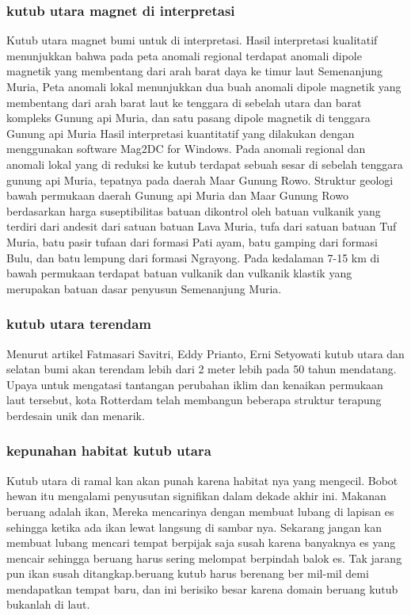 \subsubsection{kutub utara magnet di interpretasi}
		Kutub utara magnet bumi untuk di interpretasi. Hasil interpretasi kualitatif menunjukkan bahwa pada peta anomali regional terdapat anomali dipole 
	magnetik yang membentang dari arah barat daya ke timur laut Semenanjung Muria, Peta anomali lokal menunjukkan dua buah anomali dipole magnetik yang 
	membentang dari arah barat laut ke tenggara di sebelah utara dan barat kompleks Gunung api Muria, dan satu pasang dipole magnetik di tenggara Gunung api
	Muria Hasil interpretasi kuantitatif yang dilakukan dengan menggunakan software Mag2DC for Windows. Pada anomali regional dan anomali lokal yang di reduksi
	ke kutub terdapat sebuah sesar di sebelah tenggara gunung api Muria, tepatnya pada daerah Maar Gunung Rowo. Struktur geologi bawah permukaan daerah 
	Gunung api Muria dan Maar Gunung Rowo berdasarkan harga suseptibilitas batuan dikontrol oleh batuan vulkanik yang terdiri dari andesit dari 
	satuan batuan Lava Muria, tufa dari satuan batuan Tuf Muria, batu pasir tufaan dari formasi Pati ayam, batu gamping dari formasi Bulu, dan 
	batu lempung dari formasi Ngrayong. Pada kedalaman 7-15 km di bawah permukaan terdapat batuan vulkanik dan vulkanik klastik yang merupakan 
	batuan dasar penyusun Semenanjung Muria.
	
\subsubsection {kutub utara terendam}

		Menurut artikel Fatmasari Savitri, Eddy Prianto, Erni Setyowati kutub utara dan selatan bumi akan terendam lebih dari 2 meter lebih pada 50 
	tahun mendatang. Upaya untuk mengatasi tantangan perubahan iklim dan kenaikan permukaan laut tersebut, kota Rotterdam telah membangun beberapa 
	struktur terapung berdesain unik dan menarik. 

\subsubsection {kepunahan habitat kutub utara}
		Kutub utara di ramal kan akan punah karena habitat nya yang mengecil. Bobot hewan itu mengalami penyusutan signifikan dalam dekade akhir ini.
	Makanan beruang adalah ikan, Mereka mencarinya dengan membuat lubang di lapisan es sehingga ketika ada ikan lewat langsung di sambar nya. Sekarang jangan kan membuat lubang mencari tempat berpijak saja susah karena banyaknya es yang mencair sehingga beruang harus sering melompat berpindah balok es. Tak jarang pun ikan susah ditangkap.beruang kutub harus berenang ber mil-mil demi mendapatkan tempat baru, dan ini berisiko besar karena domain beruang kutub bukanlah di laut.
	
		



